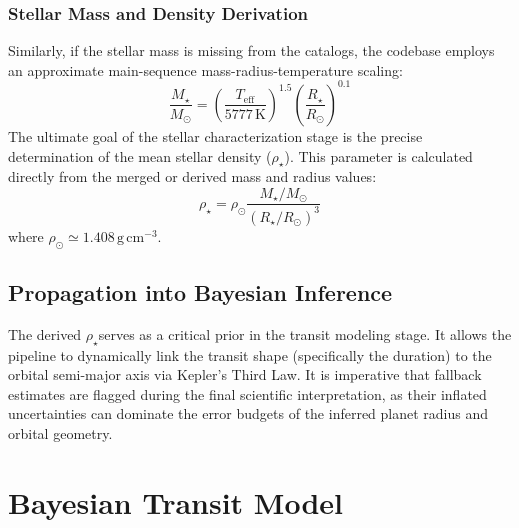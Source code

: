 \documentclass[12pt,a4paper,oneside]{report}
\newcommand{\SI}[2]{\ensuremath{#1\,\mathrm{#2}}}
\newcommand{\Msun}{\ensuremath{M_{\odot}}}
\newcommand{\Rsun}{\ensuremath{R_{\odot}}}
\newcommand{\Rstar}{\ensuremath{R_{\star}}}
\newcommand{\Mstar}{\ensuremath{M_{\star}}}
\newcommand{\Teff}{\ensuremath{T_{\mathrm{eff}}}}
\newcommand{\rhoStar}{\ensuremath{\rho_{\star}}}
\begin{document}
\subsection{Stellar Mass and Density Derivation}
Similarly, if the stellar mass is missing from the catalogs, the codebase employs an approximate main-sequence mass-radius-temperature scaling:
\begin{equation}
  \frac{\Mstar}{\Msun} = \left(\frac{\Teff}{5777\,\mathrm{K}}\right)^{1.5} \left(\frac{\Rstar}{\Rsun}\right)^{0.1}
\end{equation}
The ultimate goal of the stellar characterization stage is the precise determination of the mean stellar density (\rhoStar). This parameter is calculated directly from the merged or derived mass and radius values:
\begin{equation}
  \rhoStar = \rho_\odot \frac{\Mstar/\Msun}{(\Rstar/\Rsun)^3}
\end{equation}
where \(\rho_\odot \simeq \SI{1.408}{g\,cm^{-3}}\). 

\section{Propagation into Bayesian Inference}
The derived \rhoStar serves as a critical prior in the transit modeling stage. It allows the pipeline to dynamically link the transit shape (specifically the duration) to the orbital semi-major axis via Kepler's Third Law. It is imperative that fallback estimates are flagged during the final scientific interpretation, as their inflated uncertainties can dominate the error budgets of the inferred planet radius and orbital geometry.

\chapter{Bayesian Transit Model}
\end{document}
